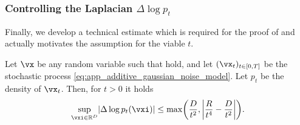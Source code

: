 \documentclass[../../book-main.tex]{subfiles}
\begin{document}
\subsubsection{Controlling the Laplacian \(\Delta \log p_{t}\)}

Finally, we develop a technical estimate which is required for the proof of  and actually motivates the assumption for the viable \(t\).

\begin{lemma}\label{lem:app_diffusion_laplacian_control}
    Let \(\vx\) be any random variable such that  hold, and let \((\vx_{t})_{t \in [0, T]}\) be the stochastic process \eqref{eq:app_additive_gaussian_noise_model}. Let \(p_{t}\) be the density of \(\vx_{t}\). Then, for \(t > 0\) it holds 
    \begin{equation}
        \sup_{\vxi \in \R^{D}}\abs{\Delta \log p_{t}(\vxi)} \leq \max\rp{\frac{D}{t^{2}}, \abs*{\frac{R}{t^{4}} - \frac{D}{t^{2}}}}.
    \end{equation}
\end{lemma}
\end{document}
